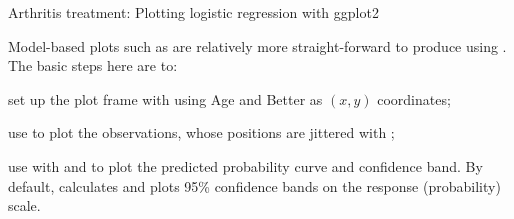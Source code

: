 \documentclass[11pt]{book}\usepackage[]{graphicx}\usepackage[]{color}
\begin{document}
\begin{Example}[arthrit8]{Arthritis treatment: Plotting logistic regression with ggplot2}

Model-based plots such as  are relatively
more straight-forward to produce using . 
The basic steps here are to: 
\begin{itemize*}
  \item set up the plot frame with  using Age and Better as $(x, y)$ coordinates; 
  \item use  to plot the observations,
  whose positions are jittered with ;
  \item use  with  and 
  to plot the predicted probability curve and confidence band. By default,  
  calculates and plots 95\% confidence bands on the response (probability) scale.
\end{itemize*}


\end{Example}
\end{document}
